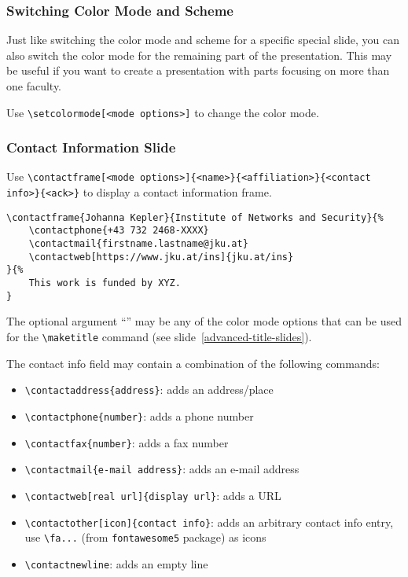 \documentclass[utf8,aspectratio=169,ngerman,english]{beamer}
\begin{document}
\jkulogo
\jkulogo[light]
\jkulogo[dark]
\jkulogo[gray]
\jkulogo[black]


\begin{frame}[containsverbatim]
\frametitle{Switching Color Mode and Scheme}

Just like switching the color mode and scheme for a specific special slide, you can also switch the color mode for the remaining part of the presentation. This may be useful if you want to create a presentation with parts focusing on more than one faculty.

Use \verb|\setcolormode[<mode options>]| to change the color mode.
\end{frame}


\begin{frame}
\frametitle{Contact Information Slide}

Use \verb|\contactframe[<mode options>]{<name>}{<affiliation>}{<contact info>}{<ack>}| to display a contact information frame. 
\begin{lstlisting}[language={[LaTeX]TeX},numbers=none]
\contactframe{Johanna Kepler}{Institute of Networks and Security}{%
    \contactphone{+43 732 2468-XXXX}
    \contactmail{firstname.lastname@jku.at}
    \contactweb[https://www.jku.at/ins]{jku.at/ins}
}{%
    This work is funded by XYZ.
}
\end{lstlisting}
The optional argument ``'' may be any of the color mode options that can be used for the \verb|\maketitle| command (see slide~\ref{advanced-title-slides}).

\framebreak
The contact info field may contain a combination of the following commands:
\begin{itemize}
\item \verb|\contactaddress{address}|: adds an address/place
\item \verb|\contactphone{number}|: adds a phone number
\item \verb|\contactfax{number}|: adds a fax number
\item \verb|\contactmail{e-mail address}|: adds an e-mail address
\item \verb|\contactweb[real url]{display url}|: adds a URL
\item \verb|\contactother[icon]{contact info}|: adds an arbitrary contact info entry, use \verb|\fa...| (from \verb|fontawesome5| package) as icons
\item \verb|\contactnewline|: adds an empty line
\end{itemize}
\end{frame}
\end{document}
